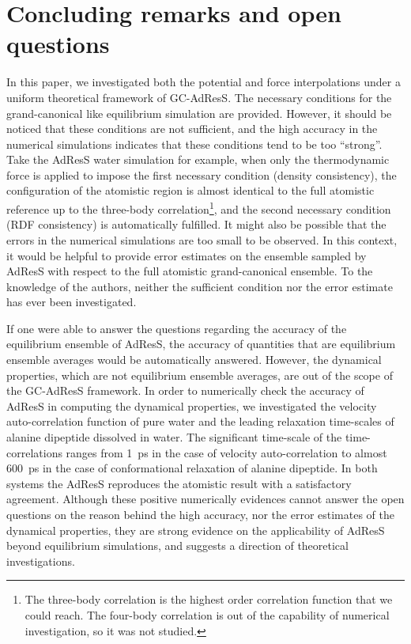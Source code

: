\documentclass[epjST]{svjour}
\begin{document}




\section{Concluding remarks and open questions}
\label{sec:conclusion}

In this paper, we investigated both the potential and force
interpolations under a uniform theoretical framework of GC-AdResS. The
necessary conditions for the grand-canonical like equilibrium
simulation are provided. However, it should be noticed that these
conditions are not sufficient, and the high accuracy in the  numerical simulations indicates
that these conditions tend to be too ``strong''.  Take the AdResS
water simulation for example, when only the thermodynamic force is
applied to impose the first necessary condition (density consistency),
the configuration of the atomistic region is almost identical to the
full atomistic reference up to the three-body
correlation\footnote{
  The three-body correlation is the highest order correlation function that we could reach.
  The four-body correlation is out of the capability of numerical
investigation, so it was not studied.}, and the second necessary condition (RDF consistency)
is automatically fulfilled.
It might also be possible that the errors in the numerical simulations are too
small to be observed.  In this context, it would be helpful
to provide error estimates on the ensemble  sampled by AdResS with respect to the full atomistic
grand-canonical ensemble.
To the knowledge of the authors,
neither the sufficient condition nor the error estimate has ever been investigated.

If one were able to answer the questions regarding the accuracy of the equilibrium
ensemble of AdResS, the accuracy of quantities that are equilibrium ensemble
averages would be automatically answered. However, the dynamical properties, which are
not equilibrium ensemble averages, are out of the scope of the 
GC-AdResS framework. In order to numerically check the accuracy of AdResS
in computing the dynamical properties, we investigated the velocity auto-correlation
function of pure water and the leading relaxation time-scales of alanine dipeptide
dissolved in water.
The significant time-scale of the time-correlations ranges from 1~ps in the case of velocity auto-correlation
to almost 600~ps in the case of conformational relaxation of alanine dipeptide.
In both systems the AdResS reproduces the atomistic result
with a satisfactory agreement.
Although these positive numerically evidences cannot answer the open questions
on the reason behind the high accuracy, nor the error estimates of the dynamical properties,
they are strong evidence on the applicability of AdResS beyond equilibrium simulations,
and suggests a direction of theoretical investigations.
\end{document}
